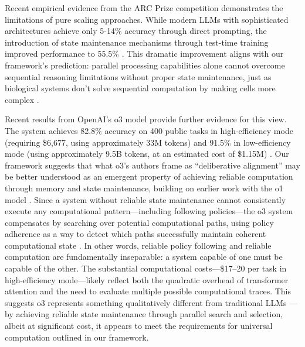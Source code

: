 \documentclass[12pt]{article}
\begin{document}
Recent empirical evidence from the ARC Prize competition demonstrates the limitations of pure scaling approaches.
While modern LLMs with sophisticated architectures achieve only 5-14\% accuracy through direct prompting, the introduction of state maintenance mechanisms through test-time training improved performance to 55.5\% \cite{chollet2024arc}.
This dramatic improvement aligns with our framework's prediction: parallel processing capabilities alone cannot overcome sequential reasoning limitations without proper state maintenance, just as biological systems don't solve sequential computation by making cells more complex \cite{wang2023parallel}.

Recent results from OpenAI's o3 model provide further evidence for this view.
The system achieves 82.8\% accuracy on 400 public tasks in high-efficiency mode (requiring \$6{,}677, using approximately 33M tokens) and 91.5\% in low-efficiency mode (using approximately 9.5B tokens, at an estimated cost of \$1.15M) \cite{chollet2024o3}.
Our framework suggests that what o3's authors frame as ``deliberative alignment'' \cite{openai2024o3blog,guan2024deliberative} may be better understood as an emergent property of achieving reliable computation through memory and state maintenance, building on earlier work with the o1 model \cite{openai2024learning}.
Since a system without reliable state maintenance cannot consistently execute any computational pattern---including following policies---the o3 system compensates by searching over potential computational paths, using policy adherence as a way to detect which paths successfully maintain coherent computational state \cite{chollet2024o3, openai2024learning}.
In other words, reliable policy following and reliable computation are fundamentally inseparable: a system capable of one must be capable of the other.
The substantial computational costs---\$17--20 per task in high-efficiency mode---likely reflect both the quadratic overhead of transformer attention and the need to evaluate multiple possible computational traces.
This suggests o3 represents something qualitatively different from traditional LLMs \cite{willison2024o3}---by achieving reliable state maintenance through parallel search and selection, albeit at significant cost, it appears to meet the requirements for universal computation outlined in our framework.
\end{document}
